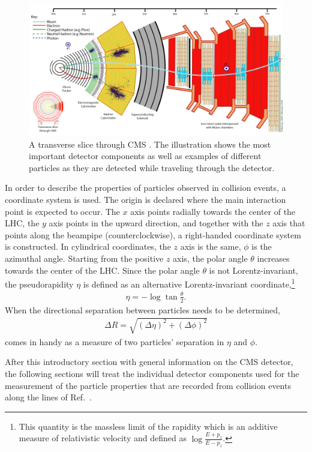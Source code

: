 \begin{figure}
	\includegraphics[width=\textwidth]{Detector/CMS_Slice}
	\centering
	\caption{A transverse slice through CMS \cite{CMS_Slice}. The illustration shows the most important detector components as well as examples of different particles as they are detected while traveling through the detector.}
	\label{fig:CMS}
\end{figure}

In order to describe the properties of particles observed in collision events, a coordinate system is used. The origin is declared where the main interaction point is expected to occur. The $x$ axis points radially towards the center of the LHC, the $y$ axis points in the upward direction, and together with the $z$ axis that points along the beampipe (counterclockwise), a right-handed coordinate system is constructed. In cylindrical coordinates, the $z$ axis is the same, $\phi$ is the azimuthal angle. Starting from the positive $z$ axis, the polar angle $\theta$ increases towards the center of the LHC. Since the polar angle $\theta$ is not Lorentz-invariant, the pseudorapidity $\eta$ is defined as an alternative Lorentz-invariant coordinate,\footnote{This quantity is the massless limit of the rapidity which is an additive measure of relativistic velocity and defined as $\log \frac{E + p_z}{E - p_z}$.}
\begin{eqnarray}
	\eta = - \log \tan \frac{\theta}{2}.
\end{eqnarray}
When the directional separation between particles needs to be determined,
\begin{eqnarray}
	\Delta R = \sqrt{(\Delta \eta)^2 + (\Delta \phi)^2}
\end{eqnarray}
comes in handy as a measure of two particles' separation in $\eta$ and $\phi$.

After this introductory section with general information on the CMS detector, the following sections will treat the individual detector components used for the measurement of the particle properties that are recorded from collision events along the lines of Ref.~\cite{CERN-THESIS-2012-068}.

